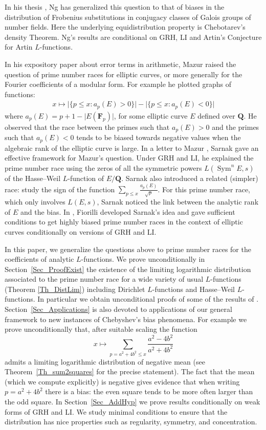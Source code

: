 \documentclass[a4paper,10pt]{amsart}
\theoremstyle{plain}
\theoremstyle{definition}
\begin{document}
In his thesis \cite{NgThesis}, Ng has generalized this question to that
of biases in the distribution of Frobenius substitutions in conjugacy classes of Galois groups of number fields. 
Here the underlying equidistribution property is Chebotarev's density Theorem.
Ng's results are conditional on GRH, LI and Artin's Conjecture for Artin $L$-functions.

In his expository paper about error terms in arithmetic, 
Mazur \cite{MazurErrorTerm} raised the question of prime number races for elliptic curves, 
or more generally for the Fourier coefficients of a modular form.
For example he plotted graphs of functions:
\begin{align*}
x\mapsto \lvert\lbrace p\leq x : a_{p}(E) >0 \rbrace\rvert -  \lvert\lbrace p\leq x : a_{p}(E) <0 \rbrace\rvert
\end{align*}
where $a_{p}(E) = p+1 - \lvert E(\mathbf{F}_{p})\rvert$, 
for some elliptic curve $E$ defined over $\mathbf{Q}$.
He observed that the race between the primes such that $a_{p}(E) >0 $ 
and the primes such that $a_{p}(E) <0 $
tends to be biased towards negative values when the algebraic rank of the elliptic curve is large.
In a letter to Mazur \cite{SarnakLetter}, 
Sarnak gave an effective framework for Mazur's question.
Under GRH and LI, 
he explained the prime number race using the zeros of all the symmetric powers $L(\operatorname{Sym}^{n}E,s)$ of the Hasse--Weil $L$-function of $E/\mathbf{Q}$.
Sarnak also introduced a related (simpler) race: study the sign of the function 
$\sum_{p\leq x}\frac{a_{p}(E)}{\sqrt{p}}$.
For this prime number race, which only involves $L(E,s)$, Sarnak noticed the link between the analytic rank of $E$ and the bias.
In \cite{FioEC}, Fiorilli developed Sarnak's idea
and gave sufficient conditions to get highly biased prime number races in the context of elliptic curves conditionally on versions of GRH and LI.

In this paper, we generalize the questions above to prime number races for the coefficients of analytic $L$-functions. 
We prove unconditionally in Section~\ref{Sec_ProofExist} the existence of the limiting logarithmic distribution associated to the prime number race for a wide variety of usual $L$-functions (Theorem \ref{Th_DistLim}) including Dirichlet $L$-functions and Hasse--Weil $L$-functions.
In particular we obtain unconditional proofs of some of the results of \cite{RS}.
Section~\ref{Sec_Applications} is also devoted to applications of our general framework to new instances of Chebyshev's bias phenomena.
For example we prove unconditionally that, after suitable scaling the function
$$x\mapsto\sum_{p=a^{2} + 4b^{2}\leq x}\frac{a^{2} - 4b^{2}}{a^{2} + 4b^{2}}$$
admits a limiting logarithmic distribution of negative mean (see Theorem~\ref{Th_sum2squares} for the precise statement). 
The fact that the mean (which we compute explicitly) is negative gives evidence that when writing $p=a^{2}+4b^{2}$ there is a bias: the even square tends to be more often larger than the odd square.
In Section~\ref{Sec_AddHyp} we prove results conditionally on weak forms of GRH and LI.
We study minimal conditions to ensure that the distribution has nice properties such as regularity, symmetry, and concentration.
\end{document}

